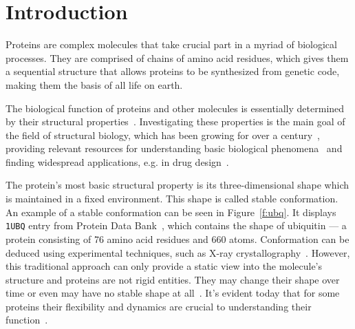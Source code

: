 \chapter{Introduction}\label{c:introduction}

Proteins are complex molecules that take crucial part in a myriad of biological processes.
They are comprised of chains of amino acid residues, which gives them a sequential structure that 
allows proteins to be synthesized from genetic code, making them the basis of all life on earth.

The biological function of proteins and other molecules is essentially determined
by their structural properties~\cite{md_aa}. Investigating these properties is the main goal 
of the field of structural biology, which has been growing for over a century~\cite{sb},
providing relevant resources for understanding basic biological phenomena~\cite{md_aa}
and finding widespread applications, e.g. in drug design~\cite{sb_health}.

The protein's most basic structural property is its three-dimensional shape which is maintained in a fixed environment. 
This shape is called stable conformation. An example of a stable conformation can be seen in Figure~\ref{f:ubq}. It displays \texttt{1UBQ} entry from Protein Data Bank~\cite{pdb}, which contains the shape of ubiquitin --- a protein consisting of 76 amino acid residues and 660 atoms.
Conformation can be deduced using experimental techniques, such as X-ray crystallography~\cite{sb}.
However, this traditional approach can only provide a static view into the molecule's structure and proteins are not rigid entities. They may change their shape over time or even may have no stable shape at all~\cite{idp}. It's evident today that for some proteins their flexibility and dynamics are crucial to understanding their function~\cite{dyn_proteins}.


